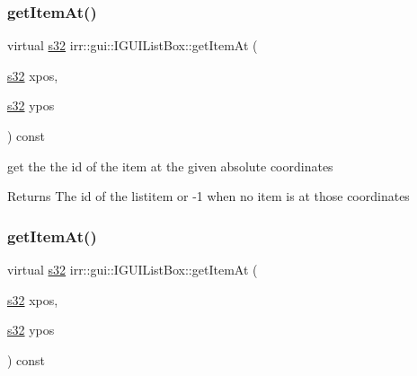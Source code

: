 \subsubsection{\texorpdfstring{get\+Item\+At()}{getItemAt()}\hspace{0.1cm}{\footnotesize\ttfamily [1/2]}}
{\footnotesize\ttfamily virtual \hyperlink{namespaceirr_ac66849b7a6ed16e30ebede579f9b47c6}{s32} irr\+::gui\+::\+I\+G\+U\+I\+List\+Box\+::get\+Item\+At (\begin{DoxyParamCaption}\item[{\hyperlink{namespaceirr_ac66849b7a6ed16e30ebede579f9b47c6}{s32}}]{xpos,  }\item[{\hyperlink{namespaceirr_ac66849b7a6ed16e30ebede579f9b47c6}{s32}}]{ypos }\end{DoxyParamCaption}) const\hspace{0.3cm}{\ttfamily [pure virtual]}}



get the the id of the item at the given absolute coordinates 

\begin{DoxyReturn}{Returns}
The id of the listitem or -\/1 when no item is at those coordinates 
\end{DoxyReturn}
\mbox{\label{classirr_1_1gui_1_1IGUIListBox_a8e1fe86805d9b970b89878291f0ccd25}} 
\subsubsection{\texorpdfstring{get\+Item\+At()}{getItemAt()}\hspace{0.1cm}{\footnotesize\ttfamily [2/2]}}
{\footnotesize\ttfamily virtual \hyperlink{namespaceirr_ac66849b7a6ed16e30ebede579f9b47c6}{s32} irr\+::gui\+::\+I\+G\+U\+I\+List\+Box\+::get\+Item\+At (\begin{DoxyParamCaption}\item[{\hyperlink{namespaceirr_ac66849b7a6ed16e30ebede579f9b47c6}{s32}}]{xpos,  }\item[{\hyperlink{namespaceirr_ac66849b7a6ed16e30ebede579f9b47c6}{s32}}]{ypos }\end{DoxyParamCaption}) const\hspace{0.3cm}{\ttfamily [pure virtual]}}



